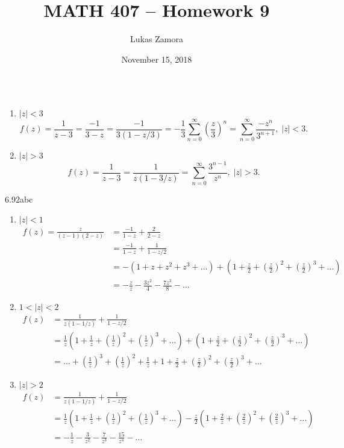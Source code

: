 \documentclass{article}
\title{MATH 407 -- Homework 9}
\author{Lukas Zamora}
\date{November 15, 2018}
\theoremstyle{definition}
\begin{document}
    \maketitle
    
    \begin{prob}{6.91} $ $
    	\begin{enumerate}[label=\alph*.)]
    		\item $|z|<3$ 
    			\[
    				f(z) = \frac{1}{z-3} = \frac{-1}{3-z} = \frac{-1}{3(1-z/3)} = -\frac{1}{3} \sum\limits_{n=0}^{\infty} \left( \frac{z}{3} \right)^n = \sum\limits_{n=0}^{\infty} \frac{-z^n}{3^{n+1}}, \; |z|<3. 
    			\]
    		\item $|z|>3$
    			\[
    				f(z) = \frac{1}{z-3} = \frac{1}{z(1-3/z)} = \sum\limits_{n=0}^{\infty} \frac{3^{n-1}}{z^n}, \; |z|>3.
    			\] 
    	\end{enumerate}
    \end{prob}

    \begin{prob}{6.92abc} $ $
    	\begin{enumerate}[label=\alph*.)]
    		\item $|z|<1$
    			\begin{align*}
    				f(z) = \frac{z}{(z-1)(2-z)} &= \frac{-1}{1-z} + \frac{2}{2-z} \\
    					&= \frac{-1}{1-z} + \frac{1}{1-z/2} \\
    					&= -(1+z+z^2+z^3+\dots) + \left( 1 + \frac{z}{2} + \left(\frac{z}{2}\right)^2 + \left(\frac{z}{2}\right)^3 + \dots \right) \\
    					&= -\frac{z}{z} - \frac{3z^2}{4} - \frac{7z^3}{8} - \dots
    			\end{align*}
    		\item $1<|z|<2$
    			\begin{align*}
    				f(z) &= \frac{1}{z(1-1/z)} + \frac{1}{1-z/2} \\
    					 &= \frac{1}{z} \left( 1 + \frac{1}{z} + \left(\frac{1}{z}\right)^2 + \left(\frac{1}{z}\right)^3 + \dots \right) + \left( 1 + \frac{z}{2} + \left(\frac{z}{2}\right)^2 + \left(\frac{z}{2}\right)^3 + \dots \right) \\
    					 &= \dots + \left(\frac{1}{z}\right)^3 + \left(\frac{1}{z}\right)^2 + \frac{1}{z} + 1 + \frac{z}{2} + \left(\frac{z}{2}\right)^2 + \left(\frac{z}{2}\right)^3 + \dots
    			\end{align*}
    		\item $|z|>2$
    			\begin{align*}
    				f(z) &= \frac{1}{z(1-1/z)} + \frac{1}{1-z/2} \\
    					 &= \frac{1}{z}\left( 1 + \frac{1}{z} + \left( \frac{1}{z} \right)^2 + \left(\frac{1}{z}\right)^3 + \dots \right) - \frac{z}{2}\left( 1 + \frac{2}{z} + \left(\frac{2}{z}\right)^2 + \left(\frac{2}{z}\right)^3 + \dots \right) \\
    					 &= -\frac{1}{z} - \frac{3}{z^2} - \frac{7}{z^3} - \frac{15}{z^4} - \dots
    			\end{align*}	
    	\end{enumerate}
    \end{prob}
\end{document}
